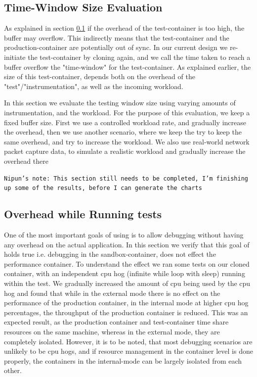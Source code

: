 \subsection{Time-Window Size Evaluation}
\label{sec:timewindowPerformance}

As explained in section \ref{sec:timewindowPerformance} if the overhead of the test-container is too high, the buffer may overflow.
This indirectly means that the test-container and the production-container are potentially out of sync.
In our current design we re-initiate the test-container by cloning again, and we call the time taken to reach a buffer overflow the "time-window" for the test-container.
As explained earlier, the size of this test-container, depends both on the overhead of the "test"/"instrumentation", as well as the incoming workload.

In this section we evaluate the testing window size using varying amounts of instrumentation, and the workload.
For the purpose of this evaluation, we keep a fixed buffer size. 
First we use a controlled workload rate, and gradually increase the overhead, then we use another scenario, where we keep the try to keep the same overhead, and try to increase the workload.
We also use real-world network packet capture data, to simulate a realistic workload and gradually increase the overhead there

\texttt{Nipun's note: This section still needs to be completed, I'm finishing up some of the results, before I can generate the charts}

\subsection{Overhead while Running tests}
\label{sec:overhead}

One of the most important goals of using \parikshan is to allow debugging without having any overhead on the actual application.
In this section we verify that this goal of \parikshan holds true i.e. debugging in the sandbox-container, does not effect the performance container. 
To understand the effect we ran some tests on our cloned container, with an independent cpu hog (infinite while loop with sleep) running within the test.
We gradually increased the amount of cpu being used by the cpu hog and found that while in the external mode there is no effect on the performance of the production container, in the internal mode at higher cpu hog percentages, the throughput of the production container is reduced.
This was an expected result, as the production container and test-container time share resources on the same machine, whereas in the external mode, they are completely isolated.
However, it is to be noted, that most debugging scenarios are unlikely to be cpu hogs, and if resource management in the container level is done properly, the containers in the internal-mode can be largely isolated from each other.

